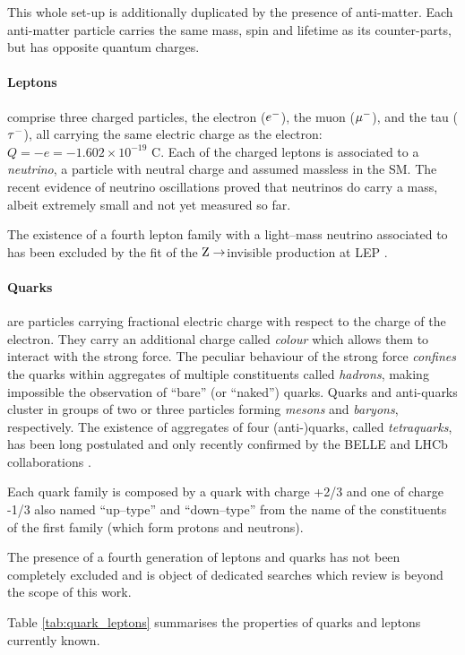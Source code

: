 This whole set-up is additionally duplicated by the presence of anti-matter. Each anti-matter particle carries the same mass, spin and lifetime as its counter-parts, but has opposite quantum charges.

\paragraph{Leptons} comprise three charged particles, the electron ($e\-$), the muon ($\mu\-$), and the tau ($\tau\-$), all carrying the same electric charge as the electron: $Q = -e = -1.602 \times 10^{-19}$ C. Each of the charged leptons is associated to a \emph{neutrino}, a particle with neutral charge and assumed massless in the SM. The recent evidence of neutrino oscillations \cite{Agafonova:2010dc} proved that neutrinos do carry a mass, albeit extremely small and not yet measured so far. 

The existence of a fourth lepton family with a light--mass neutrino associated to has been excluded by the fit of the $\Z\To$invisible production at LEP \cite{ALEPH:2005ab}. 

\paragraph{Quarks} are particles carrying fractional electric charge with respect to the charge of the electron. They carry an additional charge called \emph{colour} which allows them to interact with the strong force. The peculiar behaviour of the strong force \emph{confines} the quarks within aggregates of multiple constituents called \emph{hadrons}, making impossible the observation of ``bare'' (or ``naked'') quarks. Quarks and anti-quarks cluster in groups of two or three particles forming \emph{mesons} and \emph{baryons}, respectively. The existence of aggregates of four (anti-)quarks, called \emph{tetraquarks}, has been long postulated and only recently confirmed by the BELLE \cite{Choi:2007wga} and LHCb collaborations \cite{Aaij:2014jqa}.

Each quark family is composed by a quark with charge +2/3 and one of charge -1/3 also named ``up--type'' and ``down--type'' from the name of the constituents of the first family (which form protons and neutrons).

The presence of a fourth generation of leptons and quarks has not been completely excluded and is object of dedicated searches which review is beyond the scope of this work.

Table \ref{tab:quark_leptons} summarises the properties of quarks and leptons currently known.

